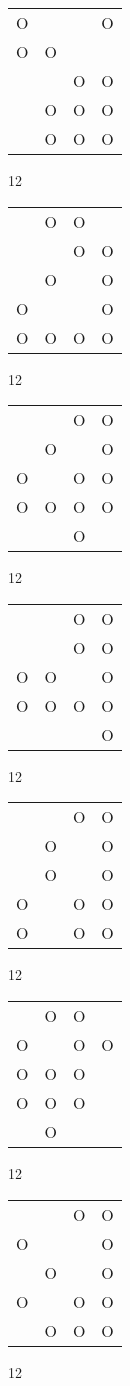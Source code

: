\begin{tabular}{|m{0.2cm}m{0.2cm}m{0.2cm}m{0.2cm}|}\hline
O& & &O\\
O&O& & \\
 & &O&O\\
 &O&O&O\\
 &O&O&O\\
\hline\end{tabular}12
\begin{tabular}{|m{0.2cm}m{0.2cm}m{0.2cm}m{0.2cm}|}\hline
 &O&O& \\
 & &O&O\\
 &O& &O\\
O& & &O\\
O&O&O&O\\
\hline\end{tabular}12
\begin{tabular}{|m{0.2cm}m{0.2cm}m{0.2cm}m{0.2cm}|}\hline
 & &O&O\\
 &O& &O\\
O& &O&O\\
O&O&O&O\\
 & &O& \\
\hline\end{tabular}12
\begin{tabular}{|m{0.2cm}m{0.2cm}m{0.2cm}m{0.2cm}|}\hline
 & &O&O\\
 & &O&O\\
O&O& &O\\
O&O&O&O\\
 & & &O\\
\hline\end{tabular}12
\begin{tabular}{|m{0.2cm}m{0.2cm}m{0.2cm}m{0.2cm}|}\hline
 & &O&O\\
 &O& &O\\
 &O& &O\\
O& &O&O\\
O& &O&O\\
\hline\end{tabular}12
\begin{tabular}{|m{0.2cm}m{0.2cm}m{0.2cm}m{0.2cm}|}\hline
 &O&O& \\
O& &O&O\\
O&O&O& \\
O&O&O& \\
 &O& & \\
\hline\end{tabular}12
\begin{tabular}{|m{0.2cm}m{0.2cm}m{0.2cm}m{0.2cm}|}\hline
 & &O&O\\
O& & &O\\
 &O& &O\\
O& &O&O\\
 &O&O&O\\
\hline\end{tabular}12
